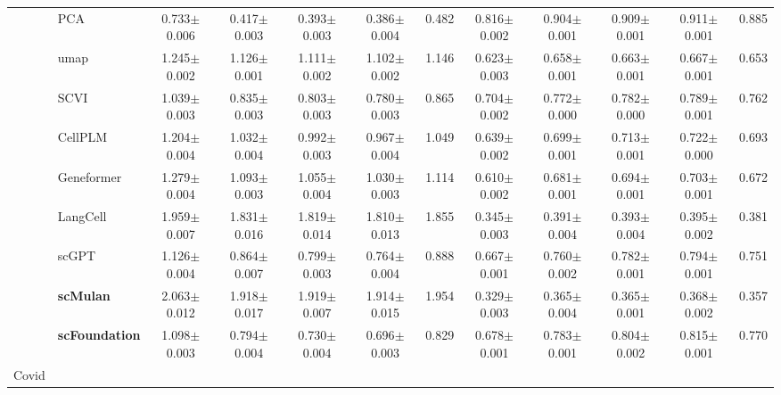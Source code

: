 \begin{table}[htbp]
\begin{tabular}{cl|ccccc|ccccc}
    & PCA      & \cellcolor{gray!25}0.733$\pm$0.006 & \cellcolor{gray!25}0.417$\pm$0.003 & \cellcolor{gray!25}0.393$\pm$0.003 & \cellcolor{gray!25}0.386$\pm$0.004 & \cellcolor{gray!25}0.482      & \cellcolor{gray!25}0.816$\pm$0.002 & \cellcolor{gray!25}0.904$\pm$0.001 & \cellcolor{gray!25}0.909$\pm$0.001 & \cellcolor{gray!25}0.911$\pm$0.001 & \cellcolor{gray!25}0.885 \\
    & umap      & 1.245$\pm$0.002 & 1.126$\pm$0.001 & 1.111$\pm$0.002 & 1.102$\pm$0.002 & 1.146      & 0.623$\pm$0.003 & 0.658$\pm$0.001 & 0.663$\pm$0.001 & 0.667$\pm$0.001 & 0.653 \\
    & SCVI      & 1.039$\pm$0.003 & 0.835$\pm$0.003 & 0.803$\pm$0.003 & 0.780$\pm$0.003 & 0.865      & 0.704$\pm$0.002 & 0.772$\pm$0.000 & 0.782$\pm$0.000 & 0.789$\pm$0.001 & 0.762 \\
    & CellPLM      & 1.204$\pm$0.004 & 1.032$\pm$0.004 & 0.992$\pm$0.003 & 0.967$\pm$0.004 & 1.049      & 0.639$\pm$0.002 & 0.699$\pm$0.001 & 0.713$\pm$0.001 & 0.722$\pm$0.000 & 0.693 \\
    & Geneformer      & 1.279$\pm$0.004 & 1.093$\pm$0.003 & 1.055$\pm$0.004 & 1.030$\pm$0.003 & 1.114      & 0.610$\pm$0.002 & 0.681$\pm$0.001 & 0.694$\pm$0.001 & 0.703$\pm$0.001 & 0.672 \\
    & LangCell      & 1.959$\pm$0.007 & 1.831$\pm$0.016 & 1.819$\pm$0.014 & 1.810$\pm$0.013 & 1.855      & 0.345$\pm$0.003 & 0.391$\pm$0.004 & 0.393$\pm$0.004 & 0.395$\pm$0.002 & 0.381 \\
    & scGPT      & 1.126$\pm$0.004 & 0.864$\pm$0.007 & 0.799$\pm$0.003 & 0.764$\pm$0.004 & 0.888      & 0.667$\pm$0.001 & 0.760$\pm$0.002 & 0.782$\pm$0.001 & 0.794$\pm$0.001 & 0.751 \\
    & \cellcolor{gray!25}\textbf{scMulan}      & 2.063$\pm$0.012 & 1.918$\pm$0.017 & 1.919$\pm$0.007 & 1.914$\pm$0.015 & 1.954      & 0.329$\pm$0.003 & 0.365$\pm$0.004 & 0.365$\pm$0.001 & 0.368$\pm$0.002 & 0.357 \\
    & \cellcolor{gray!25}\textbf{scFoundation}      & 1.098$\pm$0.003 & 0.794$\pm$0.004 & 0.730$\pm$0.004 & 0.696$\pm$0.003 & 0.829      & 0.678$\pm$0.001 & 0.783$\pm$0.001 & 0.804$\pm$0.002 & 0.815$\pm$0.001 & 0.770 \\
    \midrule

    \multirow{9}{*}{Covid}


\end{tabular}
\end{table}
